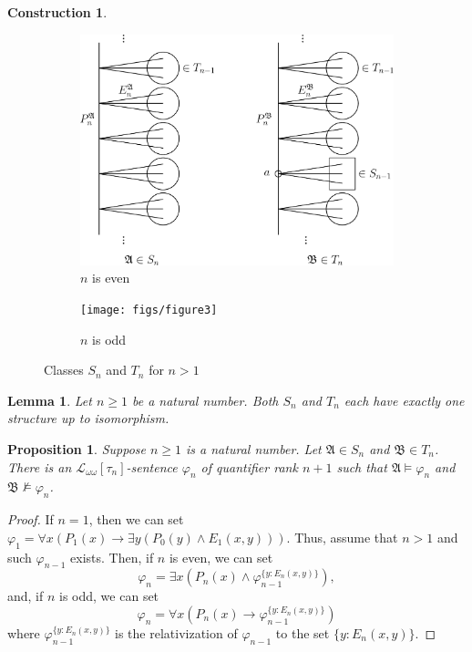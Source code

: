 \documentclass{ndjflart}
\theoremstyle{plain}
\newtheorem{lemma}[conjecture]{Lemma}
\newtheorem{proposition}[conjecture]{Proposition}
\theoremstyle{definition}
\newtheorem{construction}[conjecture]{Construction}
\numberwithin{equation}{section}
\begin{document}
\begin{construction}
\begin{figure}
	\begin{subfigure}{0.5\textwidth}
		\includegraphics[scale = 0.6]{figs/figure2}
		\caption{$n$ is even}
	\end{subfigure}
	\begin{subfigure}{0.5\textwidth}
		\texttt{[image: figs/figure3]}
		\caption{$n$ is odd}
	\end{subfigure}
	\caption{Classes $S_n$ and $T_n$ for $n > 1$}
	\label{fig2}
\end{figure}

\end{construction}


\begin{lemma}\label{exactly_one}
Let $n\geq 1$ be a natural number. Both $S_n$ and $T_n$ each have exactly one structure up to isomorphism. 
\end{lemma}


\begin{proposition}\label{suppose}
Suppose $n \geq 1$ is a natural number.
Let $\mathfrak{A} \in S_n$ and $\mathfrak{B} \in T_n$.
There is an $\mathcal{L}_{\omega\omega}[\tau_n]$-sentence $\varphi_n$ of quantifier rank $n+1$ such that $\mathfrak{A} \vDash \varphi_n$ and $\mathfrak{B} \nvDash \varphi_n$.
\end{proposition}
\begin{proof}
If $n = 1$, then we can set $\varphi_1 = \forall x (P_1(x)\rightarrow \exists y (P_0(y) \wedge E_1(x,y)))$.
Thus, assume that $n > 1$ and such $\varphi_{n-1}$ exists.
Then, if $n$ is even, we can set 
\[
	\varphi_n = \exists x (P_n(x) \wedge \varphi_{n-1}^{\{y \colon E_n(x,y)\}}),
\]
and, if $n$ is odd, we can set 
\[
	\varphi_n = \forall x (P_n(x)\rightarrow \varphi_{n-1}^{\{y \colon E_n(x,y)\}})
\]
where $\varphi_{n-1}^{\{y \colon E_n(x,y)\}}$ is the relativization of $\varphi_{n-1}$ to the set $\{y \colon E_n(x,y)\}$. 
\end{proof}
\end{document}
